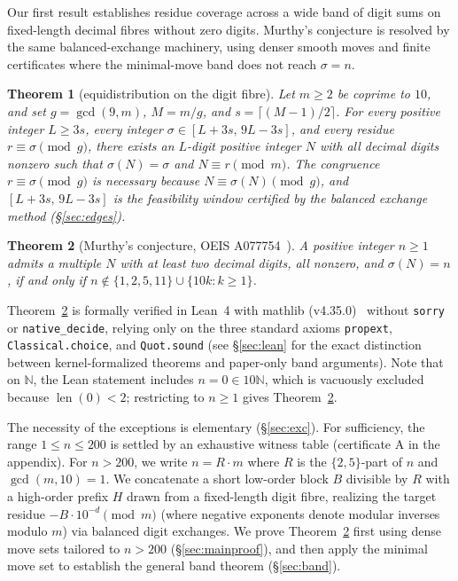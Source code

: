 \documentclass[11pt]{article}
\newtheorem{theorem}{Theorem}
\theoremstyle{remark}
\newcommand{\N}{\mathbb{N}}
\newcommand{\sig}{\sigma}
\begin{document}
Our first result establishes residue coverage across a wide band of digit sums
on fixed-length decimal fibres without zero digits. Murthy's conjecture is
resolved by the same balanced-exchange machinery, using denser smooth moves
and finite certificates where the minimal-move band does not reach
$\sig = n$.

\begin{theorem}[equidistribution on the digit fibre]
\label{thm:band}
Let $m \ge 2$ be coprime to $10$, and set $g = \gcd(9,m)$, $M = m/g$, and
$s = \lceil (M-1)/2 \rceil$. For every positive integer $L \ge 3s$, every integer
$\sig \in [L+3s,\,9L-3s]$, and every residue $r \equiv \sig \pmod g$, there
exists an $L$-digit positive integer $N$ with all decimal digits nonzero such
that $\sig(N)=\sig$ and $N \equiv r \pmod m$. The congruence
$r \equiv \sig \pmod g$ is necessary because $N \equiv \sig(N) \pmod g$, and
$[L+3s,\,9L-3s]$ is the feasibility window certified by the balanced exchange
method (\S\ref{sec:edges}).
\end{theorem}

\begin{theorem}[Murthy's conjecture, OEIS A077754~\cite{oeis}]
\label{cor:murthy}
A positive integer $n \ge 1$ admits a multiple $N$ with at least two decimal
digits, all nonzero, and $\sig(N) = n$, if and only if
$n \notin \{1,2,5,11\} \cup \{10k : k \ge 1\}$.
\end{theorem}

Theorem~\ref{cor:murthy} is formally verified in Lean~4 with mathlib
(v4.35.0)~\cite{lean} without \texttt{sorry} or \texttt{native\_decide},
relying only on the three standard axioms \texttt{propext},
\texttt{Classical.choice}, and \texttt{Quot.sound} (see \S\ref{sec:lean} for
the exact distinction between kernel-formalized theorems and paper-only band
arguments). Note that on $\N$, the Lean statement includes $n = 0 \in 10\N$,
which is vacuously excluded because $\operatorname{len}(0) < 2$; restricting
to $n \ge 1$ gives Theorem~\ref{cor:murthy}.

The necessity of the exceptions is elementary (\S\ref{sec:exc}). For
sufficiency, the range $1 \le n \le 200$ is settled by an exhaustive witness
table (certificate A in the appendix). For $n > 200$, we write $n = R\cdot m$
where $R$ is the $\{2,5\}$-part of $n$ and $\gcd(m,10)=1$. We concatenate a
short low-order block $B$ divisible by $R$ with a high-order prefix $H$ drawn
from a fixed-length digit fibre, realizing the target residue
$-B\cdot 10^{-d} \pmod m$ (where negative exponents denote modular inverses
modulo $m$) via balanced digit exchanges. We prove Theorem~\ref{cor:murthy}
first using dense move sets tailored to $n > 200$ (\S\ref{sec:mainproof}), and
then apply the minimal move set to establish the general band theorem
(\S\ref{sec:band}).
\end{document}
